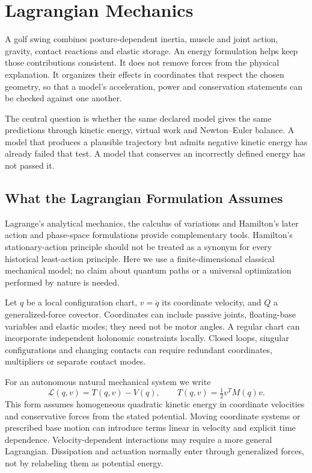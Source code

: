 \chapter{Lagrangian Mechanics}
\label{ch:lagrangian}

A golf swing combines posture-dependent inertia, muscle and joint action, gravity, contact reactions and elastic storage. An energy formulation helps keep those contributions consistent. It does not remove forces from the physical explanation. It organizes their effects in coordinates that respect the chosen geometry, so that a model's acceleration, power and conservation statements can be checked against one another.

The central question is whether the same declared model gives the same predictions through kinetic energy, virtual work and Newton--Euler balance. A model that produces a plausible trajectory but admits negative kinetic energy has already failed that test. A model that conserves an incorrectly defined energy has not passed it.

\section{What the Lagrangian Formulation Assumes}
\label{sec:lagrangian_scope}
\label{laymans:energy_intuition}
\label{laymans:context_box}

Lagrange's analytical mechanics, the calculus of variations and Hamilton's later action and phase-space formulations provide complementary tools. Hamilton's stationary-action principle should not be treated as a synonym for every historical least-action principle. Here we use a finite-dimensional classical mechanical model; no claim about quantum paths or a universal optimization performed by nature is needed.

Let $q$ be a local configuration chart, $v=\dot q$ its coordinate velocity, and $Q$ a generalized-force covector. Coordinates can include passive joints, floating-base variables and elastic modes; they need not be motor angles. A regular chart can incorporate independent holonomic constraints locally. Closed loops, singular configurations and changing contacts can require redundant coordinates, multipliers or separate contact modes.

For an autonomous natural mechanical system we write
\begin{equation}
\mathcal L(q,v)=T(q,v)-V(q),\qquad
T(q,v)=\tfrac12v^TM(q)v.
\label{eq:lagrangian}
\end{equation}
This form assumes homogeneous quadratic kinetic energy in coordinate velocities and conservative forces from the stated potential. Moving coordinate systems or prescribed base motion can introduce terms linear in velocity and explicit time dependence. Velocity-dependent interactions may require a more general Lagrangian. Dissipation and actuation normally enter through generalized forces, not by relabeling them as potential energy.

